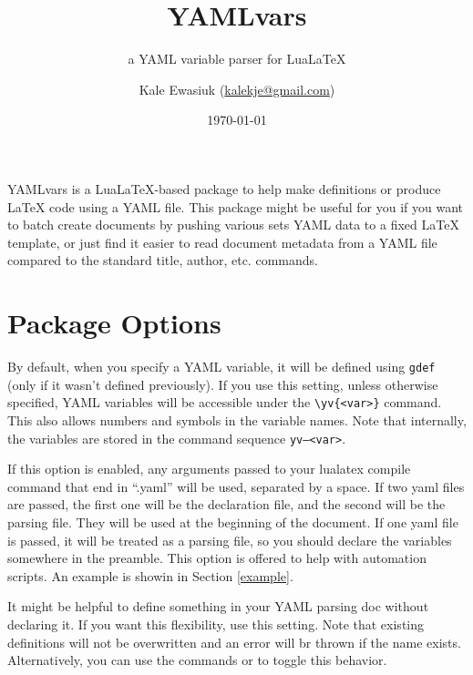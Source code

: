 \documentclass[11pt,parskip=half]{scrartcl}
\author{Kale Ewasiuk (\url{kalekje@gmail.com})}
\date{\today}
\title{YAMLvars}
\subtitle{a YAML variable parser for LuaLaTeX}
\newcommand{\llcmd}[1]{\leavevmode\llap{\texttt{\detokenize{#1}\ }}}
\newcommand{\cmd}[1]{\texttt{\detokenize{#1}}}
\begin{document}
\maketitle








YAMLvars is a LuaLaTeX-based package to help make definitions or produce LaTeX code using a YAML file.
This package might be useful for you if you want to batch create documents
by pushing various sets YAML data to a fixed LaTeX template,
or just find it easier to read document metadata from a YAML file compared to the
standard title, author, etc. commands.

\section{Package Options}
\leavevmode{}By default, when you specify a YAML variable, it will be defined using \texttt{gdef}
(only if it wasn't defined previously).
If you use this setting, unless otherwise specified, YAML variables will be accessible under
the \texttt{\textbackslash yv\{<var>\}} command.
This also allows numbers and symbols in the variable names.
Note that internally, the variables are stored in the command sequence
\texttt{yv--<var>}.

\leavevmode{}If this option is enabled, any arguments passed to your lualatex compile
command that end in ``.yaml'' will be used, separated by a space.
If two yaml files are passed, the first one will be the declaration file,
and the second will be the parsing file.
They will be used at the beginning of the document.
If one yaml file is passed, it will be treated as a parsing file, so you should
declare the variables somewhere in the preamble.
This option is offered to help with automation scripts.
An example is showin in Section \ref{example}.

\hspace*{3ex}\llcmd{allowundeclared}%
It might be helpful to define something in your YAML parsing doc without declaring it.
If you want this flexibility, use this setting. Note that existing definitions will not be overwritten and an error
will br thrown if the name exists. Alternatively, you can use the commands \cmd{\AllowUndeclaredYV} or \cmd{\ForbidUndeclaredYV} to toggle this behavior.
\end{document}
